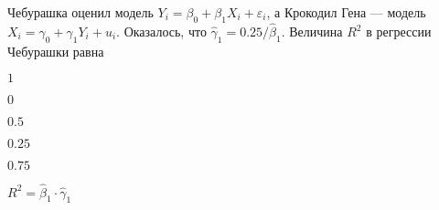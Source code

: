 
\begin{question}
Чебурашка оценил модель \(Y_i = \beta_0 + \beta_1 X_i + \varepsilon_i\),
а Крокодил Гена --- модель \(X_i = \gamma_0 + \gamma_1 Y_i + u_i\).
Оказалось, что \(\hat\gamma_1 = 0.25/\hat\beta_1\). Величина \(R^2\) в
регрессии Чебурашки равна
\begin{answerlist}
  \item \(1\)
  \item \(0\)
  \item \(0.5\)
  \item \(0.25\)
  \item \(0.75\)
\end{answerlist}
\end{question}

\begin{solution}
\(R^2 = \hat\beta_1 \cdot \hat\gamma_1\)
\end{solution}

